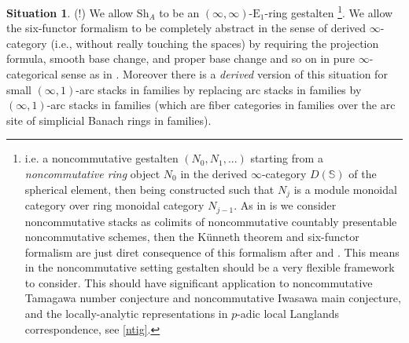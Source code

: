 \documentclass[12pt]{article}
\theoremstyle{definition}
\newtheorem{situation}{Situation}
\begin{document}
\begin{situation}
(!) We allow $\mathrm{Sh}_A$ to be an $(\infty,\infty)$-$\mathrm{E}_1$-ring gestalten \footnote{i.e. a noncommutative gestalten $(N_0,N_1,...)$ starting from a \textit{noncommutative ring} object $N_0$ in the derived $\infty$-category $D(\mathbb{S})$ of the spherical element, then being constructed such that $N_j$ is a module monoidal category over ring monoidal category $N_{j-1}$. As in \cite{5S5} is we consider noncommutative stacks as colimits of noncommutative countably presentable noncommutative schemes, then the K\"unneth theorem and six-functor formalism are just diret consequence of this formalism after \cite{5S5} and \cite{5G}. This means in the noncommutative setting gestalten should be a very flexible framework to consider. This should have significant application to noncommutative Tamagawa number conjecture and noncommutative Iwasawa main conjecture, and the locally-analytic representations in $p$-adic local Langlands correspondence, see \cref{ntig}.}. We allow the six-functor formalism to be completely abstract in the sense of derived $\infty$-category (i.e., without really touching the spaces) by requiring the projection formula, smooth base change, and proper base change and so on in pure $\infty$-categorical sense as in \cite{3CS1}. Moreover there is a \textit{derived} version of this situation for small $(\infty,1)$-arc stacks in families by replacing arc stacks in families by $(\infty,1)$-arc stacks in families (which are fiber categories in families over the arc site of simplicial Banach rings in families). 
\end{situation}
\end{document}
